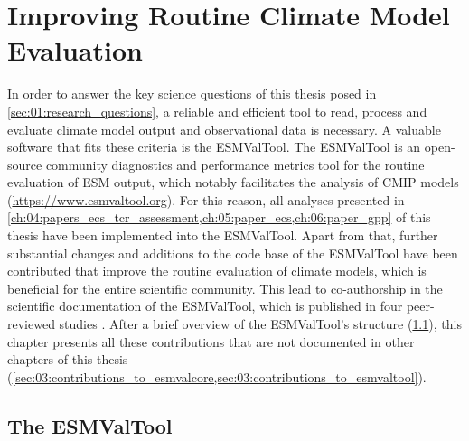 


\chapter{Improving Routine Climate Model Evaluation}
\label{ch:03:esmvaltool}

In order to answer the key science questions of this thesis posed in
\cref{sec:01:research_questions}, a reliable and efficient tool to read,
process and evaluate climate model output and observational data is necessary.
A valuable software that fits these criteria is the \ac{ESMValTool}. The
\ac{ESMValTool} is an open-source community diagnostics and performance metrics
tool for the routine evaluation of \ac{ESM} output, which notably facilitates
the analysis of \ac{CMIP} models (\url{https://www.esmvaltool.org}). For this
reason, all analyses presented in
\cref{ch:04:papers_ecs_tcr_assessment,ch:05:paper_ecs,ch:06:paper_gpp} of this
thesis have been implemented into the \ac{ESMValTool}. Apart from that, further
substantial changes and additions to the code base of the \ac{ESMValTool} have
been contributed that improve the routine evaluation of climate models, which
is beneficial for the entire scientific community. This lead to co-authorship
in the scientific documentation of the \ac{ESMValTool}, which is published in
four peer-reviewed studies \autocite{Eyring2020, Lauer2020, Righi2020,
  Weigel2020}. After a brief overview of the \ac{ESMValTool}'s structure
(\cref{sec:03:esmvaltool}), this chapter presents all these contributions that
are not documented in other chapters of this thesis
(\cref{sec:03:contributions_to_esmvalcore,sec:03:contributions_to_esmvaltool}).


\section{The \acf{ESMValTool}}
\label{sec:03:esmvaltool}

